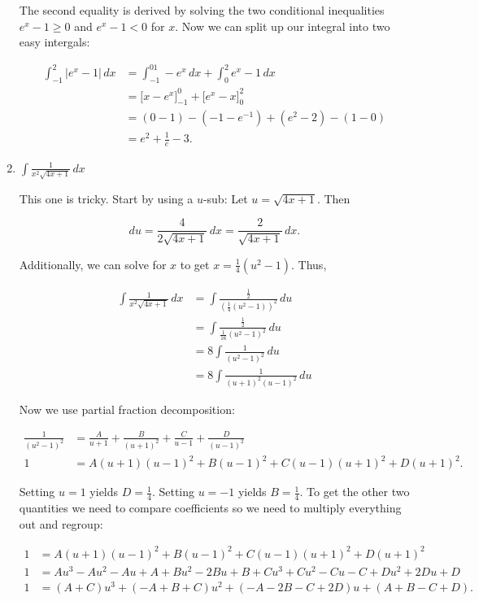 \documentclass[12pt,oneside,english]{amsart}
\begin{document}
\begin{enumerate}[leftmargin=*]
The second equality is derived by solving the two conditional inequalities $e^x-1\geq0$ and $e^x-1<0$ for $x$. Now we can split up our integral into two easy intergals:

\begin{align*}
\int_{-1}^2|e^x-1|\,dx&=\int_{-1}^01-e^x\,dx+\int_0^2e^x-1\,dx \\
&=\Big[x-e^x\Big]_{-1}^0+\Big[e^x-x\Big]_0^2 \\
&=(0-1)-(-1-e^{-1})+(e^2-2)-(1-0) \\
&=e^2+\frac{1}{e}-3.
\end{align*}

\item $\displaystyle \int\frac{1}{x^2\sqrt{4x+1}}\,dx$

This one is tricky. Start by using a $u$-sub: Let $u=\sqrt{4x+1}$. Then

\[
du=\frac{4}{2\sqrt{4x+1}}\,dx=\frac{2}{\sqrt{4x+1}}\,dx.
\]

Additionally, we can solve for $x$ to get $x=\frac{1}{4}(u^2-1)$. Thus,

\begin{align*}
\int\frac{1}{x^2\sqrt{4x+1}}\,dx&=\int\frac{\frac{1}{2}}{\left(\frac{1}{4}(u^2-1)\right)^2}\,du \\
&=\int\frac{\frac{1}{2}}{\frac{1}{16}(u^2-1)^2}\,du \\
&=8\int\frac{1}{(u^2-1)^2}\,du \\
&=8\int\frac{1}{(u+1)^2(u-1)^2}\,du
\end{align*}

Now we use partial fraction decomposition:

\begin{align*}
\frac{1}{(u^2-1)^2}&=\frac{A}{u+1}+\frac{B}{(u+1)^2}+\frac{C}{u-1}+\frac{D}{(u-1)^2} \\
1&=A(u+1)(u-1)^2+B(u-1)^2+C(u-1)(u+1)^2+D(u+1)^2.
\end{align*}

Setting $u=1$ yields $D=\frac{1}{4}$. Setting $u=-1$ yields $B=\frac{1}{4}$. To get the other two quantities we need to compare coefficients so we need to multiply everything out and regroup:

\begin{align*}
1&=A(u+1)(u-1)^2+B(u-1)^2+C(u-1)(u+1)^2+D(u+1)^2 \\
1&=Au^3-Au^2-Au+A+Bu^2-2Bu+B+Cu^3+Cu^2-Cu-C+Du^2+2Du+D \\
1&=(A+C)u^3+(-A+B+C)u^2+(-A-2B-C+2D)u+(A+B-C+D).
\end{align*}


\end{enumerate}
\end{document}
